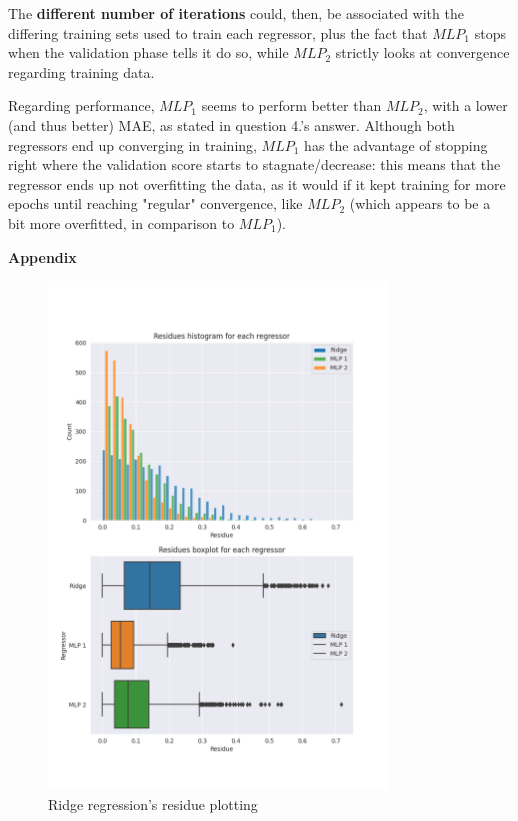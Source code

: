 \documentclass[12pt]{article}
\begin{document}
\begin{enumerate}[leftmargin=\labelsep,resume]
        The \textbf{different number of iterations} could, then, be associated
        with the differing training sets used to train each regressor, plus the
        fact that $MLP_1$ stops when the validation phase tells it do so, while $MLP_2$
        strictly looks at convergence regarding training data.

        Regarding performance, $MLP_1$ seems to perform better than $MLP_2$,
        with a lower (and thus better) MAE, as stated in question 4.'s answer.
        Although both regressors end up converging in training, $MLP_1$ has
        the advantage of stopping right where the validation score starts to
        stagnate/decrease: this means that the regressor ends up not overfitting
        the data, as it would if it kept training for more epochs until reaching
        "regular" convergence, like $MLP_2$ (which appears to be a bit more overfitted,
        in comparison to $MLP_1$).


\end{enumerate}

\pagebreak

\large{\textbf{Appendix}\vskip 0.3cm}



\begin{figure}[H]
  \centering
  \includegraphics[width=0.8\textwidth]{../assets/residues.png}
  \caption{Ridge regression's residue plotting}
  \label{fig:residue-plotting}
\end{figure}
\end{document}
